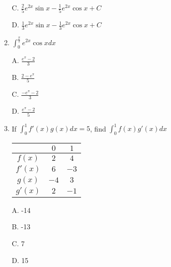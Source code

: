 \documentclass{article}
\numberwithin{equation}{section}
\begin{document}
\begin{enumerate}
    C. $\displaystyle \frac{2}{5} e^{2x} \sin x - \frac{1}{5} e^{2x} \cos x + C$

    D. $\displaystyle \frac{1}{3} e^{2x} \sin x - \frac{1}{3} e^{2x} \cos x +C$

    \item $\displaystyle \int_{0}^{\frac{\pi}{2}} e^{2x}\cos x dx$
    
    A. $\displaystyle \frac{e^\pi - 2}{3}$

    B. $\displaystyle \frac{2-e^\pi}{5}$

    C. $\displaystyle \frac{-e^\pi - 2}{3}$

    D. $\displaystyle \frac{e^\pi - 2}{5}$

    \item If $\displaystyle \int_{0}^{1} f'(x)g(x)dx = 5$, find $\displaystyle \int_{0}^{1} f(x)g'(x)dx$
    
    \begin{tabular}{||c c c||} 
    \hline
     & $0$ & $1$ \\ [0.5ex] 
    \hline\hline
    $f(x)$ & $2$ & $4$\\ 
    \hline
    $f'(x)$ & $6$ & $-3$\\
    \hline
    $g(x)$ & $-4$ & $3$\\
    \hline
    $g'(x)$ & $2$ & $-1$\\
    \hline
    \end{tabular}

    A. -14

    B. -13

    C. 7

    D. 15
\end{enumerate}

\newpage 
\end{document}
